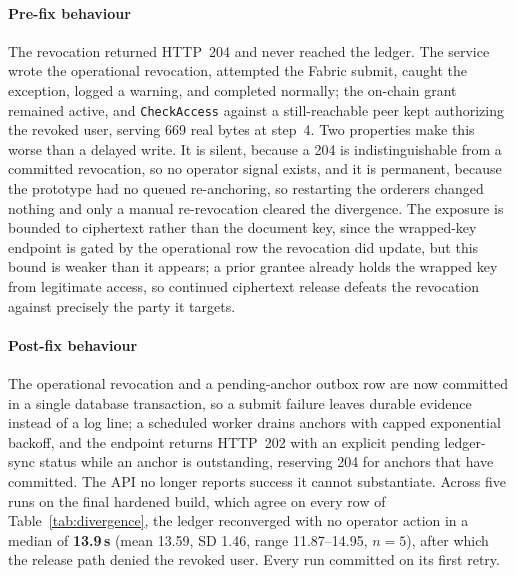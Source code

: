 \documentclass[preprint,12pt]{elsarticle}
\begin{document}
\paragraph{Pre-fix behaviour}
The revocation returned HTTP~204 and never reached the ledger. The service
wrote the operational revocation, attempted the Fabric submit, caught the
exception, logged a warning, and completed normally; the on-chain grant
remained active, and \texttt{CheckAccess} against a still-reachable peer kept
authorizing the revoked user, serving 669 real bytes at step~4. Two properties
make this worse than a delayed write. It is silent, because a 204 is
indistinguishable from a committed revocation, so no operator signal exists,
and it is permanent, because the prototype had no queued re-anchoring, so
restarting the orderers changed nothing and only a manual re-revocation
cleared the divergence. The exposure is bounded to ciphertext rather than the
document key, since the wrapped-key endpoint is gated by the operational row
the revocation did update, but this bound is weaker than it appears; a prior
grantee already holds the wrapped key from legitimate access, so continued
ciphertext release defeats the revocation against precisely the party it
targets.

\paragraph{Post-fix behaviour}
The operational revocation and a pending-anchor outbox row are now committed in
a single database transaction, so a submit failure leaves durable evidence
instead of a log line; a scheduled worker drains anchors with capped exponential
backoff, and the endpoint returns HTTP~202 with an explicit pending
ledger-sync status while an anchor is outstanding, reserving 204 for anchors
that have committed. The API no longer reports success it cannot substantiate.
Across five runs on the final hardened build, which agree on every row of
Table~\ref{tab:divergence}, the ledger reconverged with no operator action
in a median of
\textbf{13.9\,s} (mean 13.59, SD 1.46, range 11.87--14.95, $n=5$), after which
the release path denied the revoked user. Every run committed on its first
retry.
\end{document}
